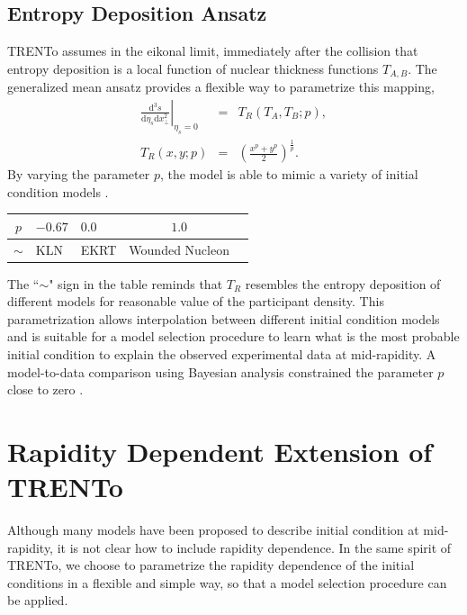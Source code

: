 \documentclass[aps,prl,twocolumn,groupedaddress]{revtex4-1}
\begin{document}
	\subsection{Entropy Deposition Ansatz}
	TRENTo assumes in the eikonal limit, immediately after the collision that entropy deposition is a local function of nuclear thickness functions $T_{A,B}$. 
	The generalized mean ansatz provides a flexible way to parametrize this mapping,
	\begin{eqnarray}
	\left.\frac{\mathrm{d^3}s}{\mathrm{d}\eta_s \mathrm{d}x_\perp^2}\right\vert_{\eta_s = 0} &=& 	T_R\left(T_A, T_B; p\right),	\\
	T_R(x, y; p) &=& \left(\frac{x^p+y^p}{2}\right)^{\frac{1}{p}}.
	\end{eqnarray}
	By varying the parameter $p$, the model is able to mimic a variety of initial condition models \cite{Scott}.
	\begin{center}
	\begin{tabularx}{0.45\textwidth}{c>{\centering\arraybackslash}m{2.0cm}>{\centering\arraybackslash}m{2cm} cX}
	\toprule[1pt]
	$p$	&	$-0.67$	 	&	$0.0$ 		& 	$1.0$		\\
	\midrule[0.5pt]	
	$\sim$ &		KLN		& 	EKRT		& 		Wounded Nucleon \\
	\bottomrule[1pt]
	\end{tabularx}
	\end{center}
	The ``$\sim$" sign in the table reminds that $T_R$ resembles the entropy deposition of different models for reasonable value of the participant density. 
	This parametrization allows interpolation between different initial condition models and is suitable for a model selection procedure to learn what is the most probable initial condition to explain the observed experimental data at mid-rapidity.
	A model-to-data comparison using Bayesian analysis constrained the parameter $p$ close to zero \citep{Jonah}.
\section{Rapidity Dependent Extension of TRENTo}
	Although many models have been proposed to describe initial condition at mid-rapidity, it is not clear how to include rapidity dependence. In the same spirit of TRENTo, we choose to parametrize the rapidity dependence of the initial conditions in a flexible and simple way, so that a model selection procedure can be applied.
	
\end{document}
